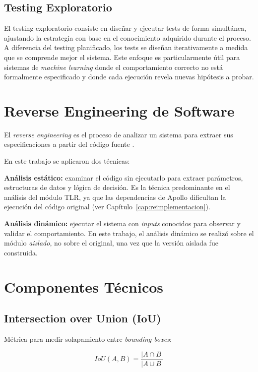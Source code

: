 \subsection{Testing Exploratorio}

El testing exploratorio consiste en diseñar y ejecutar tests de forma simultánea, ajustando la estrategia con base en el conocimiento adquirido durante el proceso. A diferencia del testing planificado, los tests se diseñan iterativamente a medida que se comprende mejor el sistema. Este enfoque es particularmente útil para sistemas de \textit{machine learning} donde el comportamiento correcto no está formalmente especificado y donde cada ejecución revela nuevas hipótesis a probar.

\section{Reverse Engineering de Software}

El \textit{reverse engineering} es el proceso de analizar un sistema para extraer sus especificaciones a partir del código fuente \cite{chikofsky1990reverse}.

En este trabajo se aplicaron dos técnicas:

\textbf{Análisis estático:} examinar el código sin ejecutarlo para extraer parámetros, estructuras de datos y lógica de decisión. Es la técnica predominante en el análisis del módulo TLR, ya que las dependencias de Apollo dificultan la ejecución del código original (ver Capítulo~\ref{cap:reimplementacion}).

\textbf{Análisis dinámico:} ejecutar el sistema con \textit{inputs} conocidos para observar y validar el comportamiento. En este trabajo, el análisis dinámico se realizó sobre el módulo \textit{aislado}, no sobre el original, una vez que la versión aislada fue construida.

\section{Componentes Técnicos}

\subsection{Intersection over Union (IoU)}

Métrica para medir solapamiento entre \textit{bounding boxes}:

\begin{equation}
IoU(A, B) = \frac{|A \cap B|}{|A \cup B|}
\end{equation}

